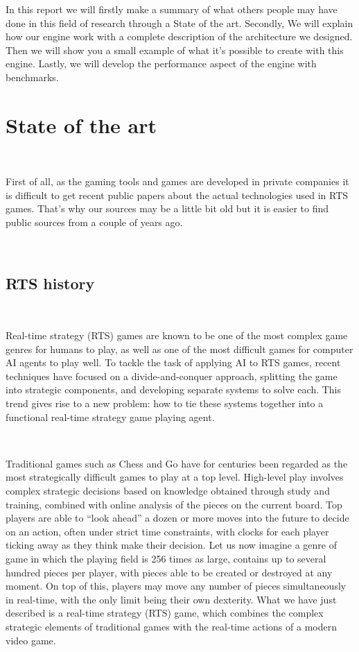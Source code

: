 \documentclass[a4paper,10pt]{book}
\begin{document}
In this report we will firstly make a summary of what others people may have done in this field of research through a State of the art. Secondly, We will explain how our engine work with a complete description of the architecture we designed. Then we will show you a small example of what it's possible to create with this engine. Lastly, we will develop the performance aspect of the engine with benchmarks.



\newpage

\section {State of the art}

~

First of all, as the gaming tools and games are developed in private companies it is difficult to get recent public papers about the actual technologies used in RTS games. 
That's why our sources may be a little bit old but it is easier to find public sources from a couple of years ago.

~

\subsection{RTS history}

~

Real-time strategy (RTS) games are known to be one of the
most  complex  game  genres  for  humans  to  play,  as  well  as
one  of  the  most  difficult  games  for  computer  AI  agents  to
play well.  To tackle the task of applying AI to RTS games,
recent techniques have focused on a divide-and-conquer approach, 
splitting the game into strategic components, and developing 
separate systems to solve each. This trend gives rise
to  a  new  problem:   how  to  tie  these  systems  together  into
a functional real-time strategy game playing agent.

~

Traditional games such as Chess and Go have for centuries
been  regarded  as  the  most  strategically  difficult  games  to
play at a top level. High-level play involves complex strategic
decisions  based  on  knowledge  obtained  through  study
and  training,  combined  with  online  analysis  of  the  pieces
on the current board.  Top players are able to “look ahead”
a dozen or more moves into the future to decide on an
action, often under strict time constraints, with clocks for each
player ticking away as they think make their decision.  Let
us now imagine a genre of game in which the playing field
is 256 times as large, contains up to several hundred pieces
per player, with pieces able to be created or destroyed at any
moment.  On top of this, players may move any number of
pieces simultaneously in real-time, with the only limit being
their own dexterity.   What we have just described is a
real-time strategy (RTS) game, which combines the complex
strategic elements of traditional games with the real-time 
actions of a modern video game.
\end{document}
